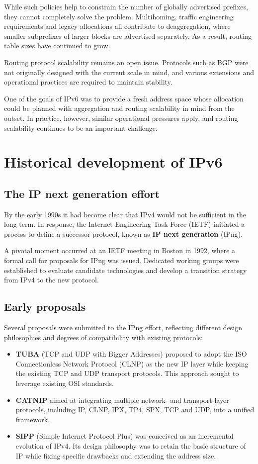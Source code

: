 \documentclass[11pt,a4paper,openany]{report}
\begin{document}
While such policies help to constrain the number of globally advertised prefixes, they cannot completely solve the problem. Multihoming, traffic engineering requirements and legacy allocations all contribute to deaggregation, where smaller subprefixes of larger blocks are advertised separately. As a result, routing table sizes have continued to grow.

Routing protocol scalability remains an open issue. Protocols such as BGP were not originally designed with the current scale in mind, and various extensions and operational practices are required to maintain stability.

One of the goals of IPv6 was to provide a fresh address space whose allocation could be planned with aggregation and routing scalability in mind from the outset. In practice, however, similar operational pressures apply, and routing scalability continues to be an important challenge.

\section{Historical development of IPv6}

\subsection{The IP next generation effort}

By the early 1990s it had become clear that IPv4 would not be sufficient in the long term. In response, the Internet Engineering Task Force (IETF) initiated a process to define a successor protocol, known as \textbf{IP next generation} (IPng).

A pivotal moment occurred at an IETF meeting in Boston in 1992, where a formal call for proposals for IPng was issued. Dedicated working groups were established to evaluate candidate technologies and develop a transition strategy from IPv4 to the new protocol.

\subsection{Early proposals}

Several proposals were submitted to the IPng effort, reflecting different design philosophies and degrees of compatibility with existing protocols:

\begin{itemize}
\item \textbf{TUBA} (TCP and UDP with Bigger Addresses) proposed to adopt the ISO Connectionless Network Protocol (CLNP) as the new IP layer while keeping the existing TCP and UDP transport protocols. This approach sought to leverage existing OSI standards.
\item \textbf{CATNIP} aimed at integrating multiple network- and transport-layer protocols, including IP, CLNP, IPX, TP4, SPX, TCP and UDP, into a unified framework.
\item \textbf{SIPP} (Simple Internet Protocol Plus) was conceived as an incremental evolution of IPv4. Its design philosophy was to retain the basic structure of IP while fixing specific drawbacks and extending the address size.
\end{itemize}
\end{document}
